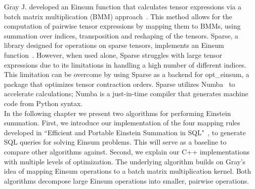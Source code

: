 Gray J. developed an Einsum function that calculates tensor expressions via a batch matrix 
multiplication (BMM) approach~\cite{jcmgray}. This method allows for the computation of pairwise 
tensor expressions by mapping them to BMMs, using summation over indices, transposition 
and reshaping of the tensors. Sparse, a library designed for operations on sparse tensors, 
implements an Einsum function~\cite{sparse}. However, when used alone, Sparse struggles with 
large tensor expressions due to its limitations in handling a high number of different indices. 
This limitation can be overcome by using Sparse as a backend for opt\_einsum, a package that 
optimizes tensor contraction orders. Sparse utilizes Numba~\cite{lam2015numba} to accelerate 
calculations; Numba is a just-in-time compiler that generates machine code from Python syntax.\\
In the following chapter we present two algorithms for performing Einstein summation. First, 
we introduce our implementation of the four mapping rules developed in ``Efficient and Portable 
Einstein Summation in SQL"~\cite{sql_einsum}, to generate SQL queries for solving Einsum problems. 
This will serve as a baseline to compare other algorithms against. Second, we explain our C++ 
implementations with multiple levels of optimization. The underlying algorithm builds on Gray's 
idea of mapping Einsum operations to a batch matrix multiplication kernel. Both algorithms decompose
large Einsum operations into smaller, pairwise operations.